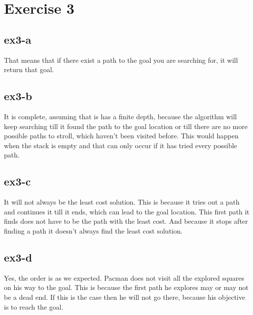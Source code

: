 \section{Exercise 3}
\subsection{ex3-a}
That means that if there exist a path to the goal you are searching for, it will return that goal.

\subsection{ex3-b}
It is complete, assuming that is has a finite depth, because the algorithm will keep searching till it found the path to the goal location or till there are no more
possible paths to stroll, which haven't been visited before. This would happen when the stack is empty
and that can only occur if it has tried every possible path.

\subsection{ex3-c}
It will not always be the least cost solution. This is because it tries out a path and continues it till it ends, which can
lead to the goal location. This first path it finds does not have to be the path with the least cost.
And because it stops after finding a path it doesn't always find the least cost solution.

\subsection{ex3-d}
Yes, the order is as we expected. Pacman does not visit all the explored squares on his way to the goal. This is because 
the first path he explores may or may not be a dead end. If this is the case then he will not go there, because his objective 
is to reach the goal.
